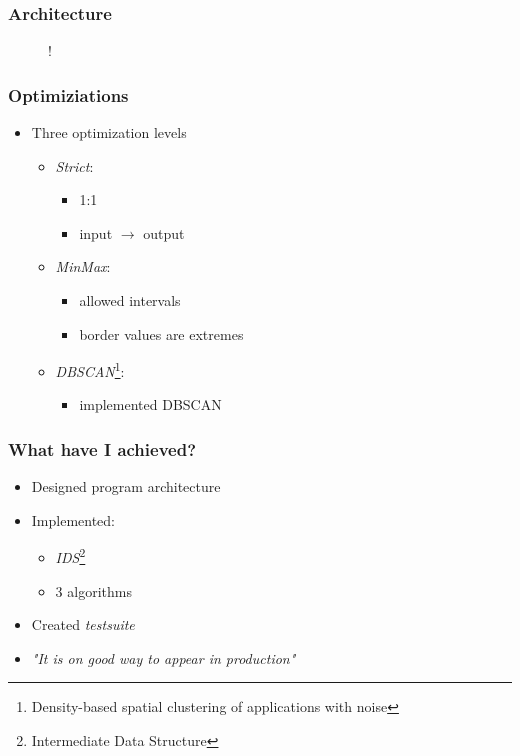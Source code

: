 \documentclass[10pt,xcolor=pdflatex]{beamer}
\begin{document}
\begin{frame}\frametitle{Architecture}
  \begin{figure}[h]
  \centering
  \resizebox {\textwidth} {!} {
    
  }
  \label{fig:tikz:architecture}
\end{figure}
\end{frame}

\begin{frame}\frametitle{Optimiziations}

  \begin{itemize}
    \item Three optimization levels
     \begin{itemize}
	    \item \emph{Strict}:
	    \begin{itemize}
	      \item 1:1
	      \item input $\rightarrow$ output
	    \end{itemize}
	    \item \emph{MinMax}:
	    \begin{itemize}
	      \item allowed intervals
	      \item border values are extremes
	    \end{itemize}
	    \item \emph{DBSCAN}\footnote{Density-based spatial clustering of applications with noise}:
	    \begin{itemize}
	      \item implemented DBSCAN\cite{Mahesh_Kumar2016, Schubert:2017:DRR:3129336.3068335}
	    \end{itemize}
	  \end{itemize}
  \end{itemize}

 
\end{frame}

\begin{frame}\frametitle{What have I achieved?}
    \begin{itemize}
    	\item Designed program architecture
    	\item Implemented:
    	\begin{itemize}
    		\item \emph{IDS}\footnote{Intermediate Data Structure}
    		\item 3 algorithms
    	\end{itemize}
    	\item Created \emph{testsuite}
    	\item \textit{"It is on good way to appear in production"}
    \end{itemize}
\end{frame}
\end{document}
